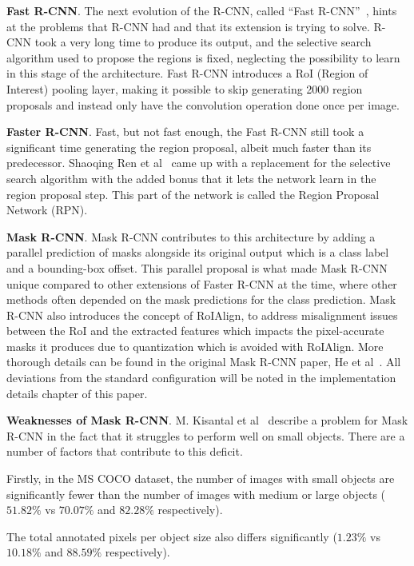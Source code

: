 \documentclass[oneside, english, bibtex]{kththesis}
\begin{document}
\textbf{Fast R-CNN}. The next evolution of the R-CNN, called “Fast R-CNN”~\cite{Girshick_2015_ICCV}, hints at the problems that R-CNN had and that its extension is trying to solve. R-CNN took a very long time to produce its output, and the selective search algorithm used to propose the regions is fixed, neglecting the possibility to learn in this stage of the architecture. Fast R-CNN introduces a RoI (Region of Interest) pooling layer, making it possible to skip generating 2000 region proposals and instead only have the convolution operation done once per image.

\textbf{Faster R-CNN}. Fast, but not fast enough, the Fast R-CNN still took a significant time generating the region proposal, albeit much faster than its predecessor. Shaoqing Ren et al~\cite{7485869} came up with a replacement for the selective search algorithm with the added bonus that it lets the network learn in the region proposal step. This part of the network is called the Region Proposal Network (RPN).

\textbf{Mask R-CNN}. Mask R-CNN contributes to this architecture by adding a parallel prediction of masks alongside its original output which is a class label and a bounding-box offset. This parallel proposal is what made Mask R-CNN unique compared to other extensions of Faster R-CNN at the time, where other methods often depended on the mask predictions for the class prediction. Mask R-CNN also introduces the concept of RoIAlign, to address misalignment issues between the RoI and the extracted features which impacts the pixel-accurate masks it produces due to quantization which is avoided with RoIAlign. More thorough details can be found in the original Mask R-CNN paper, He et al~\cite{DBLP:journals/corr/HeGDG17}. All deviations from the standard configuration will be noted in the implementation details chapter of this paper.

\textbf{Weaknesses of Mask R-CNN}.
M. Kisantal et al~\cite{DBLP:journals/corr/abs-1902-07296} describe a problem for Mask R-CNN in the fact that it struggles to perform well on small objects.
There are a number of factors that contribute to this deficit.

Firstly, in the MS COCO dataset, the number of images with small objects are significantly fewer than the number of images with medium or large objects ($51.82\%$ vs $70.07\%$ and $82.28\%$ respectively).

The total annotated pixels per object size also differs significantly ($1.23\%$ vs $10.18\%$ and $88.59\%$ respectively).
\end{document}
